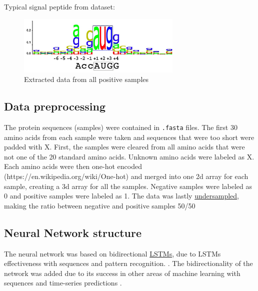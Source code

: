 Typical signal peptide from dataset:
\begin{figure}[H]
\centering
\includegraphics[width=0.7\textwidth]{pictures/seqlogo.png}
\caption{\label{fig:seqlogo}Extracted data from all positive samples}
\end{figure}

\subsection{Data preprocessing}

The protein sequences (samples) were contained in \verb|.fasta| files.
The first 30 amino acids from each sample were taken and sequences that were too short were padded with X.
First, the samples were cleared from all amino acids that were not one of the 20 standard amino acids. Unknown amino acids were labeled as X.
Each amino acids were then one-hot encoded (https://en.wikipedia.org/wiki/One-hot) and merged into one 2d array for each sample, creating a 3d array for all the samples.
Negative samples were labeled as 0 and positive samples were labeled as 1.
The data was lastly \href{https://en.wikipedia.org/wiki/Oversampling_and_undersampling_in_data_analysis}{undersampled}, making the ratio between negative and positive samples 50/50

\subsection{Neural Network structure}
The neural network was based on bidirectional \href{http://colah.github.io/posts/2015-08-Understanding-LSTMs/}{LSTMs}, due to LSTMs effectiveness with sequences and pattern recognition. \cite{rnn_effectiveness}. The bidirectionality of the network was added due to its success in other areas of machine learning with sequences and time-series predictions \cite{bidirectional_1} \cite{bidirectional_2}.

